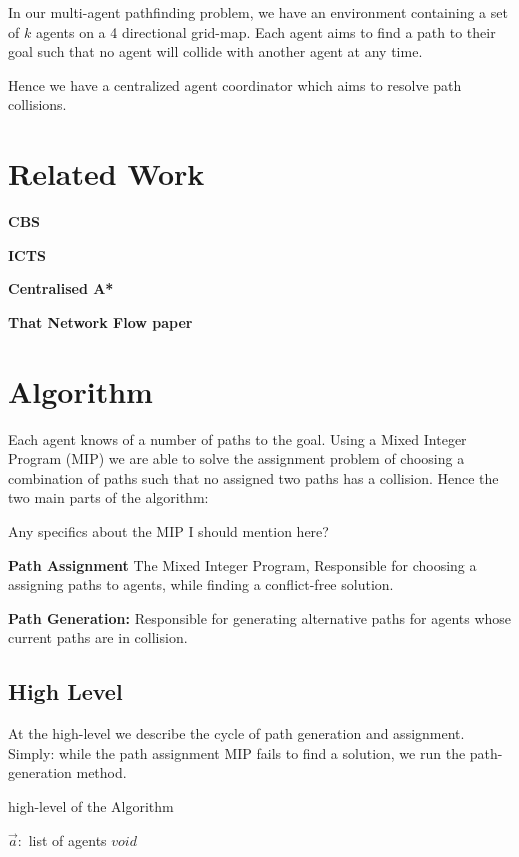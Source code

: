 \documentclass[a4paper,11pt]{article}
\begin{document}
In our multi-agent pathfinding problem, we have an environment containing a set of $k$ agents on a 4 directional grid-map. Each agent aims to find a path to their goal such that no agent will collide with another agent at any time.

Hence we have a centralized agent coordinator which aims to resolve path collisions.

\section{Related Work}
\textbf{CBS}

\textbf{ICTS}

\textbf{Centralised A*}

\textbf{That Network Flow paper}

\section{Algorithm}
Each agent knows of a number of paths to the goal. Using a Mixed Integer Program (MIP) we are able to solve the assignment problem of choosing a combination of paths such that no assigned two paths has a collision. Hence the two main parts of the algorithm:

Any specifics about the MIP I should mention here? 

\begin{compactenum}
	\item \textbf{Path Assignment} The Mixed Integer Program, Responsible for choosing a assigning paths to agents, while finding a conflict-free solution.
	\item \textbf{Path Generation:} Responsible for generating alternative paths for agents whose current paths are in collision.
\end{compactenum}

\subsection{High Level} \label{sec:high-level}
At the high-level we describe the cycle of path generation and assignment. Simply: while the path assignment MIP fails to find a solution, we run the path-generation method.

\begin{algorithm}
	\caption{high-level of the Algorithm} \label{alg:agent-coordinator}
	\begin{algorithmic}[1]
		\Require $\vec{a}:$ list of agents
		\Ensure $void$
		\Do
	\end{algorithmic}
\end{algorithm}
\end{document}

